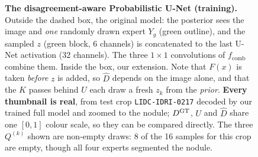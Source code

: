 \begin{figure}[!ht]
{\begin{tikzpicture}
\end{tikzpicture}}
\caption{\textbf{The disagreement-aware Probabilistic U-Net (training).}
Outside the dashed box, the original model: the posterior sees the image and
\emph{one} randomly drawn expert $Y_g$ (green outline), and the sampled $z$
(green block, 6 channels) is concatenated to the last U-Net activation
(32 channels). The three $1{\times}1$ convolutions of $f_{\text{comb}}$ combine
them.
Inside the box, our extension. Note that $F(x)$ is taken \emph{before} $z$ is
added, so $\hat D$ depends on the image alone, and that the $K$ passes behind $U$
each draw a fresh $z_k$ from the \emph{prior}. \textbf{Every thumbnail is
real}, from test crop \texttt{LIDC-IDRI-0217} decoded by our trained full model
and zoomed to the nodule; $D^{\mathrm{GT}}$, $U$ and $\hat D$ share one $[0,1]$ colour
scale, so they can be compared directly. The three $Q^{(k)}$ shown are non-empty
draws: 8 of the 16 samples for this crop are empty, though all four experts
segmented the nodule.}
\label{fig:model}
\end{figure}
